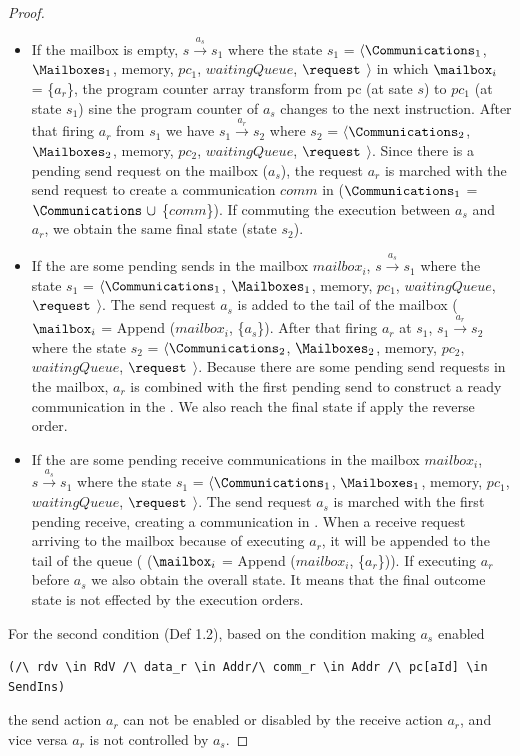 \documentclass[a4paper,11pt]{article}
\theoremstyle{break}
\begin{document}
\begin{appendices}
\begin{proof}
\begin{itemize}
\item If the mailbox  is empty, $s\xrightarrow{a_s}s_1$ where the state $s_1$ = $\langle \Communications_1$, $\Mailboxes_1$, memory, $pc_1$, $waitingQueue$, $\request$ $\rangle$ in which $\mailbox_i$ = \{$a_r$\}, the program counter array transform from pc (at sate $s$) to $pc_1$ (at state $s_1$) sine the program counter of $a_s$ changes to the next instruction. After that firing $a_r$ from $s_1$ we have $s_1\xrightarrow{a_r}s_2$ where  $s_2$ = $\langle$$\Communications_2$, $\Mailboxes_2$, memory, $pc_2$, $waitingQueue$, $\request$ $\rangle$. Since there is a pending send request on the mailbox ($a_s$), the request $a_r$ is marched with the send request to create a communication $comm$ in \Communications ($\Communications_1$ = $\Communications~ \cup$ \{$comm$\}). If commuting the execution between $a_s$ and $a_r$, we obtain the same final state (state $s_2$).

\item If the are some pending sends in the mailbox $mailbox_i$, $s\xrightarrow{a_s}s_1$ where the state $s_1$ = $\langle \Communications_1$, $\Mailboxes_1$, memory, $pc_1$, $waitingQueue$, $\request$ $\rangle$. The send request $a_s$ is added to the tail of the mailbox ($\mailbox_i$ = Append ($mailbox_i$, \{$a_s$\}). After that firing $a_r$ at $s_1$, 
$s_1\xrightarrow{a_r}s_2$ where the state $s_2$ = $\langle \Communications_2$, $\Mailboxes_2$, memory, $pc_2$, $waitingQueue$, $\request$ $\rangle$. Because there are some pending send requests in the mailbox, $a_r$ is combined with the first pending send to construct a ready communication in the \Communications. We also reach the final state if apply the reverse order. 

\item If the are some pending receive communications in the mailbox $mailbox_i$, $s\xrightarrow{a_s}s_1$ where the state $s_1$ = $\langle \Communications_1$, $\Mailboxes_1$, memory, $pc_1$, $waitingQueue$, $\request$ $\rangle$. The send request $a_s$ is marched with the first pending receive, creating a communication in \Communications. When a receive request arriving to the mailbox because of executing $a_r$, it will be appended to the tail of the queue ( ($\mailbox_i$ = Append ($mailbox_i$, \{$a_r$\})). If executing $a_r$ before $a_s$ we also obtain the overall state. It means that the final outcome state is not effected by the execution orders. 
\end{itemize}
For the second condition (Def 1.2), based on the condition making $a_s$ enabled \begin{lstlisting}[breaklines=false,  frame=none,	]
  (/\ rdv \in RdV /\ data_r \in Addr/\ comm_r \in Addr /\ pc[aId] \in SendIns)
 \end{lstlisting}
the send action $a_r$ can not be enabled or disabled by the receive action $a_r$, and vice versa $a_r$ is not controlled by $a_s$.


\end{proof}
\end{appendices}
\end{document}
